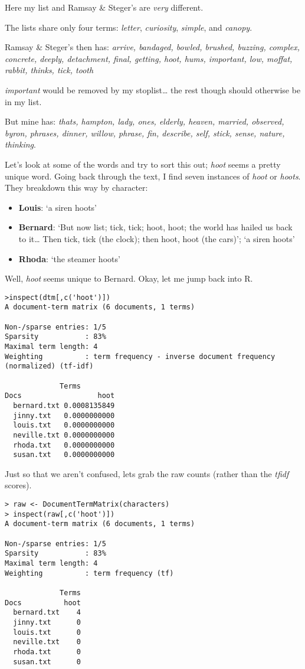 \documentclass[
  12pt,
]{article}
\providecommand{\tightlist}{%
  \setlength{\itemsep}{0pt}\setlength{\parskip}{0pt}}
\begin{document}
Here my list and Ramsay \& Steger's are \emph{very} different.

The lists share only four terms: \emph{letter}, \emph{curiosity},
\emph{simple}, and \emph{canopy}.

Ramsay \& Steger's then has: \emph{arrive, bandaged, bowled, brushed,
buzzing, complex, concrete, deeply, detachment, final, getting, hoot,
hums, important, low, moffat, rabbit, thinks, tick, tooth}

\emph{important} would be removed by my stoplist\ldots{} the rest though
should otherwise be in my list.

But mine has: \emph{thats, hampton, lady, ones, elderly, heaven,
married, observed, byron, phrases, dinner, willow, phrase, fin,
describe, self, stick, sense, nature, thinking}.

Let's look at some of the words and try to sort this out; \emph{hoot}
seems a pretty unique word. Going back through the text, I find seven
instances of \emph{hoot} or \emph{hoots}. They breakdown this way by
character:

\begin{itemize}
\tightlist
\item
  \textbf{Louis}: `a siren hoots'
\item
  \textbf{Bernard}: `But now list; tick, tick; hoot, hoot; the world has
  hailed us back to it\ldots{} Then tick, tick (the clock); then hoot,
  hoot (the cars)'; `a siren hoots'
\item
  \textbf{Rhoda}: `the steamer hoots'
\end{itemize}

Well, \emph{hoot} seems unique to Bernard. Okay, let me jump back into
R.

\begin{verbatim}
>inspect(dtm[,c('hoot')])
A document-term matrix (6 documents, 1 terms)

Non-/sparse entries: 1/5
Sparsity           : 83%
Maximal term length: 4 
Weighting          : term frequency - inverse document frequency (normalized) (tf-idf)

             Terms
Docs                  hoot
  bernard.txt 0.0008135849
  jinny.txt   0.0000000000
  louis.txt   0.0000000000
  neville.txt 0.0000000000
  rhoda.txt   0.0000000000
  susan.txt   0.0000000000
\end{verbatim}

Just so that we aren't confused, lets grab the raw counts (rather than
the \emph{tfidf} scores).

\begin{verbatim}
> raw <- DocumentTermMatrix(characters)
> inspect(raw[,c('hoot')])
A document-term matrix (6 documents, 1 terms)

Non-/sparse entries: 1/5
Sparsity           : 83%
Maximal term length: 4 
Weighting          : term frequency (tf)

             Terms
Docs          hoot
  bernard.txt    4
  jinny.txt      0
  louis.txt      0
  neville.txt    0
  rhoda.txt      0
  susan.txt      0
\end{verbatim}
\end{document}
